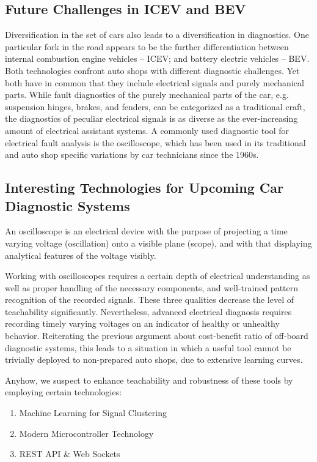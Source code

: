 \subsection{Future Challenges in ICEV and BEV}
Diversification in the set of cars also leads to a diversification in diagnostics. 
One particular fork in the road appears to be the further differentiation between internal combustion engine vehicles – ICEV; and battery electric vehicles – BEV. 
Both technologies confront auto shops with different diagnostic challenges. 
Yet both have in common that they include electrical signals and purely mechanical parts. 
While fault diagnostics of the purely mechanical parts of the car, e.g. suspension hinges, brakes, and fenders, can be categorized as a traditional craft, the diagnostics of peculiar electrical signals is as diverse as the ever-increasing amount of electrical assistant systems. 
A commonly used diagnostic tool for electrical fault analysis is the oscilloscope, which has been used in its traditional and auto shop specific variations by car technicians since the 1960s.

\subsection{Interesting Technologies for Upcoming Car Diagnostic Systems}
An oscilloscope is an electrical device with the purpose of projecting a time varying voltage (oscillation) onto a visible plane (scope), and with that displaying analytical features of the voltage visibly.

Working with oscilloscopes requires a certain depth of electrical understanding as well as proper handling of the necessary components, and well-trained pattern recognition of the recorded signals. 
These three qualities decrease the level of teachability significantly. 
Nevertheless, advanced electrical diagnosis requires recording timely varying voltages on an indicator of healthy or unhealthy behavior. 
Reiterating the previous argument about cost-benefit ratio of off-board diagnostic systems, this leads to a situation in which a useful tool cannot be trivially deployed to non-prepared auto shops, due to extensive learning curves.

Anyhow, we suspect to enhance teachability and robustness of these tools by employing certain technologies:
\begin{enumerate}[label=\alph*):]
  \item Machine Learning for Signal Clustering
  \item Modern Microcontroller Technology
  \item REST API \& Web Sockets
\end{enumerate}

